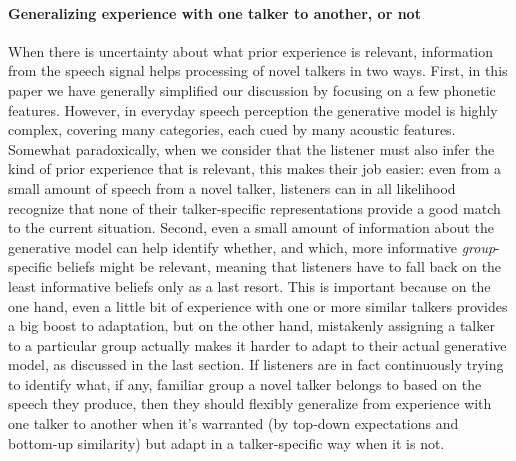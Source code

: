 \paragraph{Generalizing experience with one talker to another, or not}
\label{sec:recogn-novel-talk}

When there is uncertainty about what prior experience is relevant, information from the speech signal helps processing of novel talkers in two ways.  First, in this paper we have generally simplified our discussion by focusing on a few phonetic features.  However, in everyday speech perception the generative model is highly complex, covering many categories, each cued by many acoustic features.  Somewhat paradoxically, when we consider that the listener must also infer the kind of prior experience that is relevant, this makes their job easier: even from a small amount of speech from a novel talker, listeners can in all likelihood recognize that none of their talker-specific representations provide a good match to the current situation.  Second, even a small amount of information about the generative model can help identify whether, and which, more informative \emph{group}-specific beliefs might be relevant, meaning that listeners have to fall back on the least informative beliefs only as a last resort.  This is important because on the one hand, even a little bit of experience with one or more similar talkers provides a big boost to adaptation, but on the other hand, mistakenly assigning a talker to a particular group actually makes it harder to adapt to their actual generative model, as discussed in the last section.  If listeners are in fact continuously trying to identify what, if any, familiar group a novel talker belongs to based on the speech they produce, then they should flexibly generalize from experience with one talker to another when it's warranted (by top-down expectations and bottom-up similarity) but adapt in a talker-specific way when it is not.

